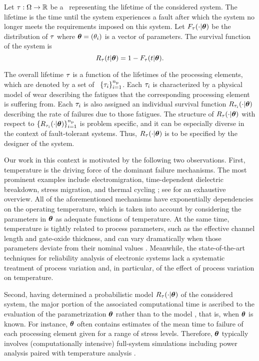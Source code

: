 Let $\tau: \Omega \to \mathbb{R}$ be a \rv\ representing the lifetime of the considered system.
The lifetime is the time until the system experiences a fault after which the system no longer meets the requirements imposed on this system.
Let $F_\tau(\cdot | \bm{\theta})$ be the distribution of $\tau$ where $\bm{\theta} = (\theta_i)$ is a vector of parameters.
The survival function of the system is
\[
  R_\tau(t | \bm{\theta}) = 1 - F_\tau(t | \bm{\theta}).
\]

The overall lifetime $\tau$ is a function of the lifetimes of the processing elements, which are denoted by a set of \rvs\ $\{ \tau_i \}_{i = 1}^{n_\text{p}}$.
Each $\tau_i$ is characterized by a physical model of wear \cite{jedec2011} describing the fatigues that the corresponding processing element is suffering from.
Each $\tau_i$ is also assigned an individual survival function $R_{\tau_i}(\cdot | \bm{\theta})$ describing the rate of failures due to those fatigues.
The structure of $R_\tau(\cdot | \bm{\theta})$ with respect to $\{ R_{\tau_i}(\cdot | \bm{\theta}) \}_{i = 1}^{n_\text{p}}$ is problem specific, and it can be especially diverse in the context of fault-tolerant systems.
Thus, $R_\tau(\cdot | \bm{\theta})$ is to be specified by the designer of the system.

Our work in this context is motivated by the following two observations.
First, temperature is the driving force of the dominant failure mechanisms.
The most prominent examples include electromigration, time-dependent dielectric breakdown, stress migration, and thermal cycling \cite{xiang2010}; see \cite{jedec2011} for an exhaustive overview.
All of the aforementioned mechanisms have exponentially dependencies on the operating temperature, which is taken into account by considering the parameters in $\bm{\theta}$ as adequate functions of temperature.
At the same time, temperature is tightly related to process parameters, such as the effective channel length and gate-oxide thickness, and can vary dramatically when those parameters deviate from their nominal values \cite{ukhov2014, juan2012}.
Meanwhile, the state-of-the-art techniques for reliability analysis of electronic systems lack a systematic treatment of process variation and, in particular, of the effect of process variation on temperature.

Second, having determined a probabilistic model $R_\tau(\cdot | \bm{\theta})$ of the considered system, the major portion of the associated computational time is ascribed to the evaluation of the parametrization $\bm{\theta}$ rather than to the model \perse, that is, when $\bm{\theta}$ is known.
For instance, $\bm{\theta}$ often contains estimates of the mean time to failure of each processing element given for a range of stress levels.
Therefore, $\bm{\theta}$ typically involves (computationally intensive) full-system simulations including power analysis paired with temperature analysis \cite{xiang2010}.

